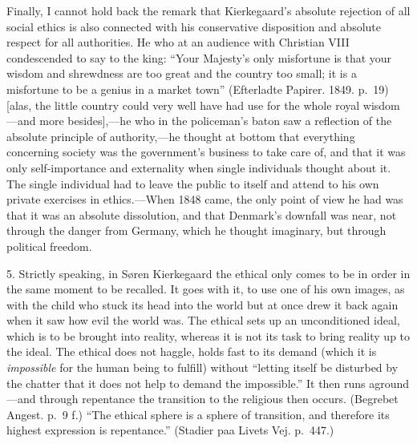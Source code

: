 \documentclass[12pt,a4paper]{book}
\newcommand{\opage}[1]{\marginnote{\footnotesize\textit{[#1]}}}
\begin{document}
Finally, I cannot hold back the remark that Kierkegaard's absolute
rejection of all social ethics is also connected with his conservative
disposition and absolute respect for all authorities. He who at an
audience with Christian VIII condescended to say to the king: ``Your
Majesty's only misfortune is that your wisdom and shrewdness are too great
and the country too small; it is a misfortune to be a genius in a market
town''
(Efterladte Papirer. 1849. p.~19) [alas, the little country could very
well have had use for the whole royal wisdom---and more besides],---he who
in the policeman's baton saw a reflection of the absolute principle of
authority,---he thought at bottom that everything concerning society was
the government's business to take care of, and that it was only
self-importance and externality when single individuals thought about it.
The single individual had to leave the public to itself and attend to his
own private exercises in ethics.---When 1848 came, the only point of view
he had was that it was an absolute dissolution, and that Denmark's
downfall was near,
\opage{108}not through the danger from Germany, which he thought
imaginary, but through political freedom.

5. Strictly speaking, in Søren Kierkegaard the ethical only comes to be in
order in the same moment to be recalled. It goes with it, to use one of
his own images, as with the child who stuck its head into the world but at
once drew it back again when it saw how evil the world was. The ethical
sets up an unconditioned ideal, which is to be brought into reality,
whereas it is not its task to bring reality up to the ideal. The ethical
does not haggle, holds fast to its demand (which it is \textit{impossible}
for the human being to fulfill) without ``letting itself be disturbed by
the chatter that it does not help to demand the impossible.'' It then runs
aground---and through repentance the transition to the religious then
occurs. (Begrebet Angest. p.~9 f.) ``The ethical sphere is a sphere of
transition, and therefore its highest expression is repentance.'' (Stadier
paa Livets Vej. p.~447.)
\end{document}
